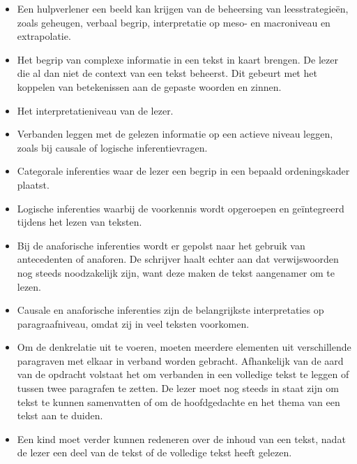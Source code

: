 \begin{itemize}
	\item Een hulpverlener een beeld kan krijgen van de beheersing van leesstrategieën, zoals geheugen, verbaal begrip, interpretatie op meso- en macroniveau en extrapolatie.
	\item Het begrip van complexe informatie in een tekst in kaart brengen. De lezer die al dan niet de context van een tekst beheerst. Dit gebeurt met het koppelen van betekenissen aan de gepaste woorden en zinnen.
	\item Het interpretatieniveau van de lezer.
	\item Verbanden leggen met de gelezen informatie op een actieve niveau leggen, zoals bij causale of logische inferentievragen. 
	\item Categorale inferenties waar de lezer een begrip in een bepaald ordeningskader plaatst.
	\item Logische inferenties waarbij de voorkennis wordt opgeroepen en geïntegreerd tijdens het lezen van teksten. 
	\item Bij de anaforische inferenties wordt er gepolst naar het gebruik van antecedenten of anaforen. De schrijver haalt echter aan dat verwijswoorden nog steeds noodzakelijk zijn, want deze maken de tekst aangenamer om te lezen.
	\item Causale en anaforische inferenties zijn de belangrijkste interpretaties op paragraafniveau, omdat zij in veel teksten voorkomen.
	\item Om de denkrelatie uit te voeren, moeten meerdere elementen uit verschillende paragraven met elkaar in verband worden gebracht. Afhankelijk van de aard van de opdracht volstaat het om verbanden in een volledige tekst te leggen of tussen twee paragrafen te zetten. De lezer moet nog steeds in staat zijn om tekst te kunnen samenvatten of om de hoofdgedachte en het thema van een tekst aan te duiden.
	\item Een kind moet verder kunnen redeneren over de inhoud van een tekst, nadat de lezer een deel van de tekst of de volledige tekst heeft gelezen. 
\end{itemize}

